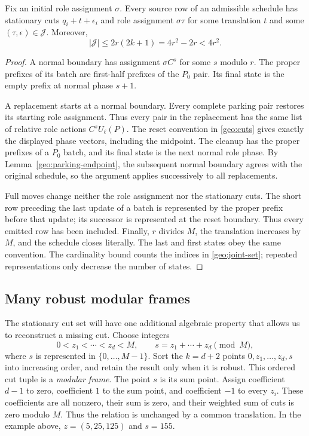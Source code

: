 \begin{lemma}
\label{geo:joint-containment}
Fix an initial role assignment $\sigma$. Every source row of an admissible
schedule has stationary cuts $q_i+t+\epsilon_i$ and role assignment
$\sigma\tau$ for some translation $t$ and some
$(\tau,\epsilon)\in\mathcal J$. Moreover,
\[
 |\mathcal J|\leq2r(2k+1)=4r^2-2r<4r^2.
\]
\end{lemma}
\begin{proof}
A normal boundary has assignment $\sigma C^s$ for some $s$ modulo $r$.
The proper prefixes of its batch are first-half prefixes of the $P_0$
pair. Its final state is the empty prefix at normal phase $s+1$.

A replacement starts at a normal boundary. Every complete parking pair
restores its starting role assignment. Thus every pair in the replacement
has the same list of relative role actions $C^sU_\ell(P)$. The reset
convention in \eqref{geo:cuts} gives exactly the displayed phase vectors,
including the midpoint. The cleanup has the proper prefixes of a $P_0$
batch, and its final state is the next normal role phase. By
Lemma~\ref{geo:parking-endpoint}, the subsequent normal boundary agrees
with the original schedule, so the argument applies successively to all
replacements.

Full moves change neither the role assignment nor the stationary cuts.
The short row preceding the last update of a batch is represented by the
proper prefix before that update; its successor is represented at the
reset boundary. Thus every emitted row has been included. Finally, $r$
divides $M$, the translation increases by $M$, and the schedule closes
literally. The last and first states obey the same convention. The
cardinality bound counts the indices in \eqref{geo:joint-set}; repeated
representations only decrease the number of states.
\end{proof}

\subsection{Many robust modular frames}

The stationary cut set will have one additional algebraic property that
allows us to reconstruct a missing cut. Choose integers
\[
 0<z_1<\cdots<z_d<M,
 \qquad s=z_1+\cdots+z_d\pmod M,
\]
where $s$ is represented in $\{0,\ldots,M-1\}$. Sort the $k=d+2$ points
$0,z_1,\ldots,z_d,s$ into increasing order, and retain the result only
when it is robust. This ordered cut tuple is a \emph{modular frame}.
The point $s$ is its sum point. Assign coefficient $d-1$ to zero,
coefficient $1$ to the sum point, and coefficient $-1$ to every $z_i$.
These coefficients are all nonzero, their sum is zero, and their weighted
sum of cuts is zero modulo $M$. Thus the relation is unchanged by a
common translation. In the example above, $z=(5,25,125)$ and $s=155$.

